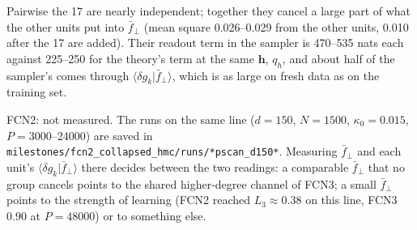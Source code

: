 \documentclass[11pt,a4paper]{article}
\begin{document}
Pairwise the 17 are nearly independent; together they cancel a large part of what the other units put into
$\bar f_\perp$ (mean square 0.026--0.029 from the other units, 0.010 after the 17 are added). Their readout
term in the sampler is 470--535 nats each against 225--250 for the theory's term at the same $\mathbf h$, $q_h$, and
about half of the sampler's comes through $\langle\delta g_k|\bar f_\perp\rangle$, which is as large on fresh data
as on the training set.

FCN2: not measured. The runs on the same line ($d=150$, $N=1500$, $\kappa_0=0.015$, $P=3000$--24000) are saved in
\texttt{milestones/fcn2\_collapsed\_hmc/runs/*pscan\_d150*}. Measuring $\bar f_\perp$ and each unit's
$\langle\delta g_k|\bar f_\perp\rangle$ there decides between the two readings: a comparable $\bar f_\perp$ that no
group cancels points to the shared higher-degree channel of FCN3; a small $\bar f_\perp$ points to the strength of
learning (FCN2 reached $L_3\approx0.38$ on this line, FCN3 $0.90$ at $P=48000$) or to something else.
\end{document}
